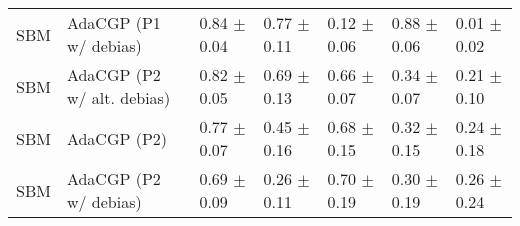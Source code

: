 \begin{tabular}{lllllll}
SBM    &       AdaCGP (P1 w/ debias) &  0.84 $\pm$ 0.04 &  0.77 $\pm$ 0.11 &  0.12 $\pm$ 0.06 &  0.88 $\pm$ 0.06 &  0.01 $\pm$ 0.02 \\
SBM    &  AdaCGP (P2 w/ alt. debias) &  0.82 $\pm$ 0.05 &  0.69 $\pm$ 0.13 &  0.66 $\pm$ 0.07 &  0.34 $\pm$ 0.07 &  0.21 $\pm$ 0.10 \\
SBM    &                 AdaCGP (P2) &  0.77 $\pm$ 0.07 &  0.45 $\pm$ 0.16 &  0.68 $\pm$ 0.15 &  0.32 $\pm$ 0.15 &  0.24 $\pm$ 0.18 \\
SBM    &       AdaCGP (P2 w/ debias) &  0.69 $\pm$ 0.09 &  0.26 $\pm$ 0.11 &  0.70 $\pm$ 0.19 &  0.30 $\pm$ 0.19 &  0.26 $\pm$ 0.24 \\
\bottomrule
\end{tabular}
